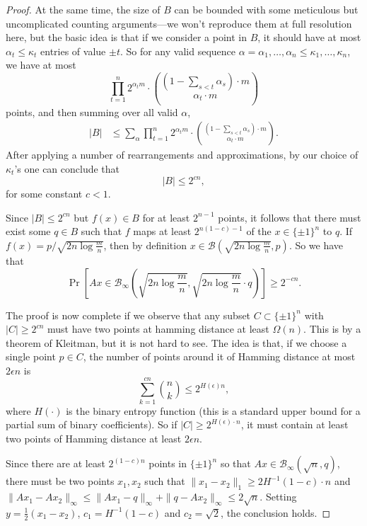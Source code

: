 \documentclass{article}
\theoremstyle{theorem}
\theoremstyle{definition}
\newcommand{\cB}{\mathcal{B}}
\begin{document}
\begin{proof}
    At the same time, the size of $B$ can be bounded with some meticulous but uncomplicated counting arguments---we won't reproduce them at full resolution here, but the basic idea is that if we consider a point in $B$, it should have at most $\alpha_t \le \kappa_t$ entries of value $\pm t$.
    So for any valid sequence $\alpha = \alpha_1,\ldots,\alpha_n \le \kappa_1,\ldots,\kappa_n$, we have at most
    \[
	\prod_{t=1}^{n}2^{\alpha_t m} \cdot \binom{\left(1 - \sum_{s < t}\alpha_s\right)\cdot m}{\alpha_t \cdot m}
    \]
    points, and then summing over all valid $\alpha$,
    \begin{align*}
	|B|
	&\le \sum_{\alpha}
	\prod_{t=1}^{n}2^{\alpha_t m} \cdot \binom{\left(1 - \sum_{s < t}\alpha_s\right)\cdot m}{\alpha_t \cdot m}.
    \end{align*}
    After applying a number of rearrangements and approximations, by our choice of $\kappa_t$'s one can conclude that
    \[
	|B| \le 2^{cn},
    \]
for some constant $c < 1$.

\medskip

    Since $|B| \le 2^{cn}$ but $f(x) \in B$ for at least $2^{n-1}$ points, it follows that there must exist some $q \in B$ such that $f$ maps at least $2^{n(1-c) -1}$ of the $x \in \{\pm 1\}^n$ to $q$.
    If $f(x) = p/\sqrt{2n\log \frac{m}{n}}$, then by definition $x \in \cB(\sqrt{2n\log \frac{m}{n}}, p)$.
    So we have that
    \[
	\Pr\left[Ax \in \cB_{\infty}\left(\sqrt{2n\log\frac{m}{n}}, \sqrt{2n\log\frac{m}{n}}\cdot q\right)\right] \ge 2^{-cn}.
    \]

The proof is now complete if we observe that any subset $C \subset \{\pm 1\}^n$ with  $|C| \ge 2^{cn}$ must have two points at hamming distance at least $\Omega(n)$.
This is by a theorem of Kleitman, but it is not hard to see.
The idea is that, if we choose a single point $p \in C$, the number of points around it of Hamming distance at most $2\epsilon n$ is
\[
    \sum_{k=1}^{cn} \binom{n}{k} \le 2^{H(\epsilon)n},
\]
where $H(\cdot)$ is the binary entropy function (this is a standard upper bound for a partial sum of binary coefficients).
So if $|C| \ge 2^{ H(\epsilon)\cdot n}$, it must contain at least two points of Hamming distance at least $2\epsilon n$.

Since there are at least $2^{(1-c)n}$ points in $\{\pm 1\}^n$ so that $Ax \in \cB_{\infty}(\sqrt{n},q)$, there must be two points $x_1,x_2$ such that $\|x_1-x_2\|_1 \ge 2H^{-1}(1-c)\cdot n$ and $\|Ax_1 - Ax_2\|_{\infty} \le \|Ax_1 - q\|_{\infty} + \|q - Ax_2\|_{\infty} \le 2\sqrt{n}$.
Setting $y = \frac{1}{2}(x_1-x_2)$, $c_1 = H^{-1}(1-c)$ and $c_2 = \sqrt{2}$, the conclusion holds.
\end{proof}
\end{document}
